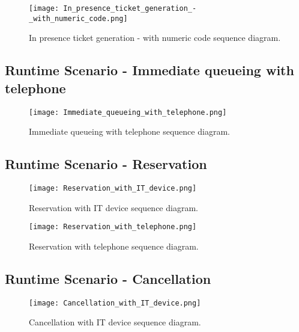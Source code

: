 \documentclass[../../main.tex]{subfiles}
\begin{document}
\begin{figure}[H]
    \centering
    \texttt{[image: In\_presence\_ticket\_generation\_-\_with\_numeric\_code.png]}
    \caption{
        In presence ticket generation - with numeric code sequence diagram.
    }
\end{figure}

\subsection{Runtime Scenario  - Immediate queueing with telephone}

\begin{figure}[H]
    \centering
    \texttt{[image: Immediate\_queueing\_with\_telephone.png]}
    \caption{
        Immediate queueing with telephone sequence diagram.
    }
\end{figure}

\subsection{Runtime Scenario  - Reservation}

\begin{figure}[H]
    \centering
    \texttt{[image: Reservation\_with\_IT\_device.png]}
    \caption{
        Reservation with IT device sequence diagram.
    }
\end{figure}

\begin{figure}[H]
    \centering
    \texttt{[image: Reservation\_with\_telephone.png]}
    \caption{
        Reservation with telephone sequence diagram.
    }
\end{figure}

\subsection{Runtime Scenario  - Cancellation}

\begin{figure}[H]
    \centering
    \texttt{[image: Cancellation\_with\_IT\_device.png]}
    \caption{
        Cancellation with IT device sequence diagram.
    }
\end{figure}
\end{document}
